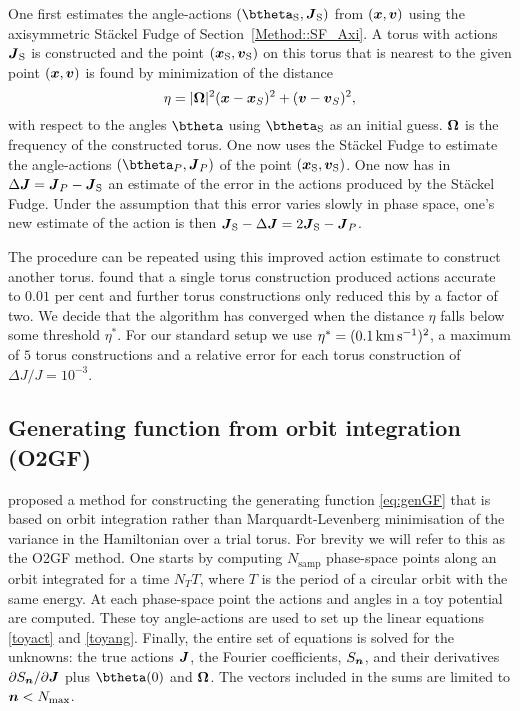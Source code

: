 \documentclass[useAMS,usenatbib,fleqn,a4paper]{mn2e}
\def\kms{\,{\rm km\,s^{-1}}}
\def\percent{\text{ per cent}}
\newcommand{\bs}[1]{\bmath{#1}}
\def\percent{\text{ per cent}}
\begin{document}
One first estimates the angle-actions $(\btheta_{\rm S},\boldsymbol{J}_{\rm S})$ from
$(\bs{x},\bs{v})$ using the axisymmetric St\"ackel Fudge of
Section~\ref{Method::SF_Axi}. A torus with actions $\boldsymbol{J}_{\rm S}$ is
constructed and the point $(\bs{x}_{\rm S},\bs{v}_{\rm S})$ on this torus that is nearest to the
given point $(\bs{x},\bs{v})$ is found by minimization of the distance
\[
\eta=|\bs{\Omega}|^2(\bs{x}-\bs{x}_S)^2+(\bs{v}-\bs{v}_S)^2,
\]
with respect to the angles $\btheta$ using $\btheta_{\rm S}$ as an initial guess. $\bs{\Omega}$ is the frequency of the constructed torus. One now uses the
St\"ackel Fudge to estimate the angle-actions $(\btheta_P,\boldsymbol{J}_P)$
of the point $(\bs{x}_{\rm S},\bs{v}_{\rm S})$. One now has in
$\Delta\bs{J}=\bs{J}_P-\bs{J}_{\rm S}$ an estimate of the error in the actions
produced by the St\"ackel Fudge.  Under the
assumption that this error varies slowly in phase space, one's new estimate
of the action is then
$\boldsymbol{J}_{\rm S}-\Delta\boldsymbol{J}=2\boldsymbol{J}_{\rm S}-\boldsymbol{J}_P$.

The procedure can be repeated using this improved action estimate to
construct another torus. \cite{SandersBinney2015} found that a single torus
construction produced actions accurate to $0.01\percent$ and further torus
constructions only reduced this by a factor of two. We decide that the algorithm has converged when the distance $\eta$ falls below some threshold $\eta^*$. For our standard setup we
use $\eta^*=(0.1\kms)^2$, a maximum of $5$ torus constructions and a relative
error for each torus construction of $\Delta J/J=10^{-3}$.

\subsection{Generating function from orbit integration (O2GF)}\label{Method::Genfunc}

\cite{SandersBinney2014} proposed a method for constructing the generating
function \eqref{eq:genGF} that is based on orbit integration rather than
Marquardt-Levenberg minimisation of the variance in the Hamiltonian over a
trial torus. For brevity we will refer to this as the O2GF method. One starts
by computing $N_\mathrm{samp}$ phase-space points along an orbit integrated
for a time $N_T T$, where $T$ is the period of a circular orbit with the same
energy. At each phase-space point the actions and angles in a toy potential
are computed. These toy angle-actions are used to set up the linear equations
\eqref{toyact} and \eqref{toyang}. Finally, the entire set of equations is
solved for the unknowns: the true actions $\bs{J}$, the Fourier
coefficients, $S_{\bs{n}}$, and their derivatives $\partial
S_{\bs{n}}/\partial\bs{J}$ plus $\btheta(0)$ and $\bs{\Omega}$. The
vectors included in the sums are limited to $\bs{n}<N_\mathrm{max}$.
\end{document}
